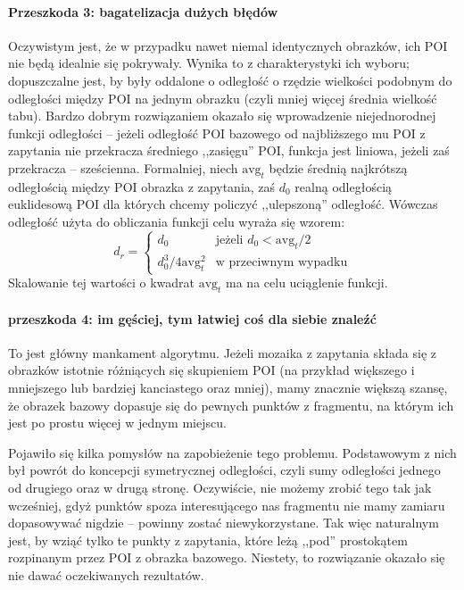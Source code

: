 \documentclass[a4paper,12pt,leqno]{article}
\begin{document}
\paragraph{Przeszkoda 3: bagatelizacja dużych błędów}
Oczywistym jest, że w przypadku nawet niemal identycznych obrazków, ich POI nie będą idealnie się pokrywały. Wynika to z charakterystyki ich wyboru; dopuszczalne jest, by były oddalone
o odległość o rzędzie wielkości podobnym do odległości między POI na jednym obrazku (czyli mniej więcej średnia wielkość tabu). 
Bardzo dobrym rozwiązaniem okazało się wprowadzenie niejednorodnej funkcji odległości -- jeżeli odległość POI bazowego od najbliższego mu POI z zapytania nie przekracza średniego ,,zasięgu''
POI, funkcja jest liniowa, jeżeli zaś przekracza -- sześcienna.
Formalniej, niech $\mathrm{avg}_t$ będzie średnią najkrótszą odległością między POI obrazka z zapytania, zaś $d_0$ realną odległością euklidesową POI dla których chcemy policzyć ,,ulepszoną'' odległość.
Wówczas odległość użyta do obliczania funkcji celu wyraża się wzorem:
\[ d_r = \begin{cases}
	    d_0 & \text{jeżeli } d_0 < \mathrm{avg}_t / 2 \\
	    d_0^3 / 4\mathrm{avg}_t^2 & \text{w przeciwnym wypadku}
	 \end{cases} \]
Skalowanie tej wartości o kwadrat $\mathrm{avg}_t$ ma na celu uciąglenie funkcji.

\paragraph{przeszkoda 4: im gęściej, tym łatwiej coś dla siebie znaleźć}
To jest główny mankament algorytmu. Jeżeli mozaika z zapytania składa się z obrazków istotnie różniących się skupieniem POI 
(na przykład większego i mniejszego lub bardziej kanciastego oraz mniej), mamy znacznie większą szansę, że obrazek bazowy dopasuje się do pewnych punktów z fragmentu, 
na którym ich jest po prostu więcej w jednym miejscu.

Pojawiło się kilka pomysłów na zapobieżenie tego problemu. Podstawowym z nich był powrót do koncepcji symetrycznej odległości, czyli sumy odległości jednego od drugiego oraz w drugą stronę.
Oczywiście, nie możemy zrobić tego tak jak wcześniej, gdyż punktów spoza interesującego nas fragmentu nie mamy zamiaru dopasowywać nigdzie -- powinny zostać niewykorzystane.
Tak więc naturalnym jest, by wziąć tylko te punkty z zapytania, które leżą ,,pod'' prostokątem rozpinanym przez POI z obrazka bazowego. Niestety, to rozwiązanie okazało się nie dawać 
oczekiwanych rezultatów.
\end{document}
